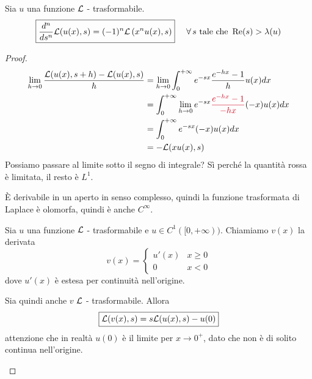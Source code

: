 \begin{thm}
Sia $u$ una funzione $\mathcal{L}$ - trasformabile.
\begin{equation*}
\boxed{\frac{d^{n}}{ds^{n}}\Lc(u(x), s) = (- 1)^{n} \Lc\left(x^{n} u(x), s\right)} \ \ \ \ \forall s\ \text{tale che} \ \Re (s) > \lambda (u)
\end{equation*}
\end{thm}
\begin{proof}
\begin{align*}
\lim\limits_{h\rightarrow 0}\frac{\Lc(u(x), s + h) - \Lc(u(x), s)}{h} & = \lim\limits_{h\rightarrow 0}\int^{+ \infty}_{0} e^{- sx}\frac{e^{- hx} - 1}{h} u(x) dx\\
 & = \int^{+ \infty}_{0}\lim\limits_{h\rightarrow 0} e^{- sx}\textcolor[rgb]{0.82, 0.01, 0.11}{\frac{e^{- hx} - 1}{- hx}}(- x) u(x) dx\\
 & = \int^{+ \infty}_{0} e^{- sx}(- x) u(x) dx\\
 & = - \Lc(xu(x), s)
\end{align*}
Possiamo passare al limite sotto il segno di integrale? Sì perché la quantità rossa è limitata, il resto è $L^{1}$.

È derivabile in un aperto in senso complesso, quindi la funzione trasformata di Laplace è olomorfa, quindi è anche $C^{\infty}$.
\begin{thm}
Sia $u$ una funzione $\mathcal{L}$ - trasformabile e $u\in C^{1}([0, + \infty))$. Chiamiamo $v(x)$ la derivata
\begin{equation*}
v(x) =
\begin{cases}
u'(x) & x\geq 0\\
0 & x < 0
\end{cases}
\end{equation*}
dove $u'(x)$ è estesa per continuità nell'origine.

Sia quindi anche $v$ $\mathcal{L}$ - trasformabile. Allora
\begin{equation*}
\boxed{\mathcal{L}(v(x), s) = s\mathcal{L}(u(x), s) - u(0)}
\end{equation*}
attenzione che in realtà $u(0)$ è il limite per $x\rightarrow 0^{+}$, dato che non è di solito continua nell'origine.


\end{thm}
\end{proof}
